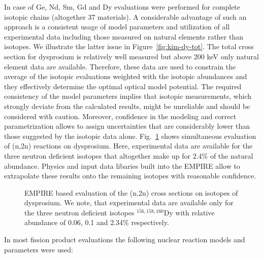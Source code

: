In case of Ge, Nd, Sm, Gd and Dy evaluations were performed for complete
isotopic chains (altogether 37 materials). A considerable advantage of such
an approach is a consistent usage of model parameters and utilization of all
experimental data including those measured on natural elements rather than
isotopes. We illustrate the latter issue in Figure~\ref{fig:kim-dy-tot}. The
total cross section for dysprosium is relatively well measured but above 200
keV only natural element data are available. Therefore, these data are used
to constrain the average of the isotopic evaluations weighted with the
isotopic abundances and they effectively determine the optimal optical model
potential. The required consistency of the model parameters implies that
isotopic measurements, which strongly deviate from the calculated results,
might be unreliable and should be considered with caution. Moreover,
confidence in the modeling and correct parametrization allows to assign
uncertainties that are considerably lower than those suggested by the
isotopic data alone. Fig.~\ref{fig:kim-dy-n2n} shows simultaneous evaluation
of (n,2n) reactions on dysprosium. Here, experimental data are available for
the three neutron deficient isotopes that altogether make up for 2.4\% of
the natural abundance. Physics and input data libaries built into the EMPIRE
allow to extrapolate these results onto the remaining isotopes with
reasonable confidence.

\begin{figure*}[htbp]
 
\caption{EMPIRE based evaluation of total cross sections on isotopes of
dysprosium. The left panel shows the comparison of data measured on the
natural element with the adequate average of the isotopic cross sections
plotted in the right panel.}
\label{fig:kim-dy-tot}
\end{figure*}

\begin{figure}[htbp]
\caption{EMPIRE based evaluation of the (n,2n) cross sections on isotopes of
dysprosium. We note, that experimental data are available only for the three
neutron deficient isotopes $^{156,158,160}$Dy with relative abundance of
0.06, 0.1 and 2.34\% respectively.}
\label{fig:kim-dy-n2n}
\end{figure}

In most fission product evaluations the following nuclear reaction models
and parameters were used:


